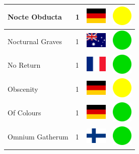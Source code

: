 \documentclass[12pt, a4paper, twoside]{report}
\begin{document}
\begin{center}
\begin{longtable}{|p{5cm}|p{2cm}|p{2cm}|p{2cm}|}
			Nocte Obducta & 1 & \includegraphics[width=1cm]{4x3/de} & \includegraphics[width=1cm]{likes/m} \\ \hline
			Nocturnal Graves & 1 & \includegraphics[width=1cm]{4x3/au} & \includegraphics[width=1cm]{likes/y} \\ \hline
			No Return & 1 & \includegraphics[width=1cm]{4x3/fr} & \includegraphics[width=1cm]{likes/y} \\ \hline
			Obscenity & 1 & \includegraphics[width=1cm]{4x3/de} & \includegraphics[width=1cm]{likes/m} \\ \hline
			Of Colours & 1 & \includegraphics[width=1cm]{4x3/de} & \includegraphics[width=1cm]{likes/y} \\ \hline
			Omnium Gatherum & 1 & \includegraphics[width=1cm]{4x3/fi} & \includegraphics[width=1cm]{likes/y} \\ \hline

\end{longtable}
\end{center}
\end{document}

